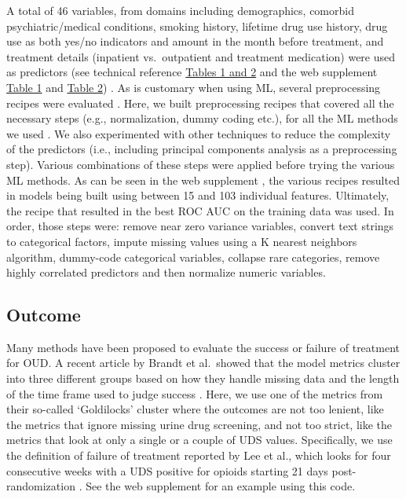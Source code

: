 \documentclass[
  number,
  preprint,
  3p,
  onecolumn]{elsarticle}
\begin{document}
A total of 46 variables, from domains including demographics, comorbid
psychiatric/medical conditions, smoking history, lifetime drug use
history, drug use as both yes/no indicators and amount in the month
before treatment, and treatment details (inpatient vs.~outpatient and
treatment medication) were used as predictors (see technical reference
\href{https://github.com/CTN-0094/ml_paper_2025/technical_reference.pdf}{Tables
1 and 2} and the web supplement
\href{https://ctn-0094.github.io/ml_paper_2025/supplement.html\#table1}{Table
1} and
\href{https://ctn-0094.github.io/ml_paper_2025/supplement.html\#table2}{Table
2}) \citep{balise_technical_2025, balise_supplement_2025}. As is
customary when using ML, several preprocessing recipes were evaluated
\citep{kuhn2022}. Here, we built preprocessing recipes that covered all
the necessary steps (e.g., normalization, dummy coding etc.), for all
the ML methods we used \citep{silge}. We also experimented with other
techniques to reduce the complexity of the predictors (i.e., including
principal components analysis as a preprocessing step). Various
combinations of these steps were applied before trying the various ML
methods. As can be seen in the web supplement
\citep{balise_supplement_2025}, the various recipes resulted in models
being built using between 15 and 103 individual features. Ultimately,
the recipe that resulted in the best ROC AUC on the training data was
used. In order, those steps were: remove near zero variance variables,
convert text strings to categorical factors, impute missing values using
a K nearest neighbors algorithm, dummy-code categorical variables,
collapse rare categories, remove highly correlated predictors and then
normalize numeric variables.

\subsection{Outcome}\label{outcome}

Many methods have been proposed to evaluate the success or failure of
treatment for OUD. A recent article by Brandt et al.~showed that the
model metrics cluster into three different groups based on how they
handle missing data and the length of the time frame used to judge
success \citep{brandt2024}. Here, we use one of the metrics from their
so-called `Goldilocks' cluster where the outcomes are not too lenient,
like the metrics that ignore missing urine drug screening, and not too
strict, like the metrics that look at only a single or a couple of UDS
values. Specifically, we use the definition of failure of treatment
reported by Lee et al., which looks for four consecutive weeks with a
UDS positive for opioids starting 21 days post-randomization
\citep{lee2018}. See the web supplement \citep{balise_supplement_2025}
for an example using this code.
\end{document}
